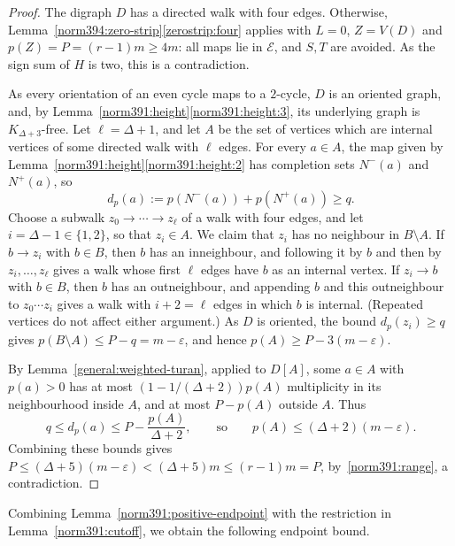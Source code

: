 \begin{proof}
The digraph $D$ has a directed walk with four edges. Otherwise, Lemma~\ref{norm394:zero-strip}\ref{zerostrip:four} applies with $L=0$, $Z=V(D)$ and
$p(Z)=P=(r-1)m\ge4m$: all maps lie in $\mathcal E$, and $S,T$ are avoided. As the sign sum of $H$ is two, this is a contradiction.

As every orientation of an even cycle maps to a $2$-cycle, $D$ is an oriented graph, and, by Lemma~\ref{norm391:height}\ref{norm391:height:3}, its underlying graph is
$K_{\Delta+3}$-free. Let $\ell=\Delta+1$, and let $A$ be the set of
vertices which are internal vertices of some directed walk with $\ell$ edges. For every
$a\in A$, the map given by Lemma~\ref{norm391:height}\ref{norm391:height:2} has completion sets $N^-(a)$ and $N^+(a)$, so
\[
 d_p(a):=p(N^-(a))+p(N^+(a))\ge q.
\]
Choose a subwalk $z_0\to\cdots\to z_\ell$ of a walk with four edges, and let $i=\Delta-1\in\{1,2\}$, so that $z_i\in A$.
We claim that $z_i$ has no neighbour in $B\setminus A$. If $b\to z_i$ with $b\in B$, then $b$ has an inneighbour, and following it by $b$ and then by $z_i,\ldots,z_\ell$ gives a walk whose first $\ell$ edges have $b$ as an internal vertex. If $z_i\to b$ with $b\in B$, then $b$ has an outneighbour, and appending $b$ and this outneighbour to $z_0\cdots z_i$ gives a walk with $i+2=\ell$ edges in which $b$ is internal. (Repeated vertices do not affect either argument.)
As $D$ is oriented, the bound $d_p(z_i)\ge q$ gives
$p(B\setminus A)\le P-q=m-\varepsilon$, and hence
$p(A)\ge P-3(m-\varepsilon)$.

By Lemma~\ref{general:weighted-turan}, applied to $D[A]$, some $a\in A$ with $p(a)>0$ has at most $(1-1/(\Delta+2))p(A)$ multiplicity in its neighbourhood inside $A$, and at most $P-p(A)$ outside $A$. Thus
\[
 q\le d_p(a)\le P-\frac{p(A)}{\Delta+2},\qquad\text{so}\qquad
 p(A)\le(\Delta+2)(m-\varepsilon).
\]
Combining these bounds gives $P\le(\Delta+5)(m-\varepsilon)
<(\Delta+5)m\le(r-1)m=P$, by~\eqref{norm391:range}, a contradiction.
\end{proof}

Combining Lemma~\ref{norm391:positive-endpoint} with the restriction in Lemma~\ref{norm391:cutoff}, we obtain the following endpoint bound.

